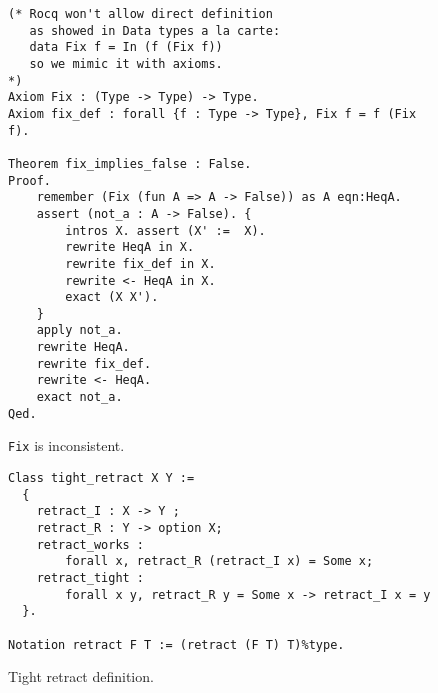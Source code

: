 \documentclass[sigplan,nonacm,review]{acmart}
\begin{document}
\begin{figure}[H]
\begin{lstlisting}[language=Coq]
(* Rocq won't allow direct definition
   as showed in Data types a la carte:
   data Fix f = In (f (Fix f))
   so we mimic it with axioms.
*)
Axiom Fix : (Type -> Type) -> Type.
Axiom fix_def : forall {f : Type -> Type}, Fix f = f (Fix f).

Theorem fix_implies_false : False. 
Proof.
    remember (Fix (fun A => A -> False)) as A eqn:HeqA.
    assert (not_a : A -> False). { 
        intros X. assert (X' :=  X).
        rewrite HeqA in X.
        rewrite fix_def in X.
        rewrite <- HeqA in X.
        exact (X X').
    }
    apply not_a.
    rewrite HeqA.
    rewrite fix_def.
    rewrite <- HeqA.
    exact not_a.
Qed.
\end{lstlisting}
\caption{\texttt{Fix} is inconsistent.}
  \label{appendix:false_proof}
\end{figure}

\begin{figure}[H]
\begin{lstlisting}[language=Coq]
Class tight_retract X Y :=
  {
    retract_I : X -> Y ;
    retract_R : Y -> option X;
    retract_works : 
        forall x, retract_R (retract_I x) = Some x;
    retract_tight : 
        forall x y, retract_R y = Some x -> retract_I x = y
  }.

Notation retract F T := (retract (F T) T)%type.
\end{lstlisting}
\caption{Tight retract definition.}
  \label{appendix:tight_retract}
\end{figure}
\end{document}
